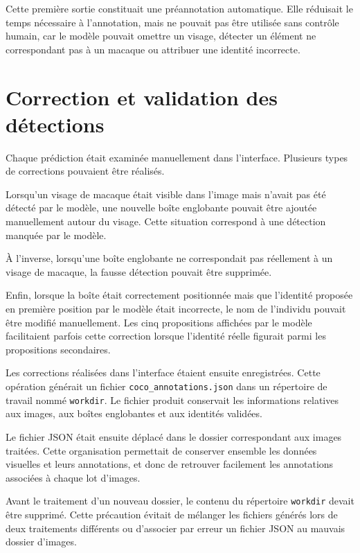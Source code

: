 \documentclass[11pt,a4paper]{report}
\begin{document}
Cette première sortie constituait une préannotation automatique. Elle réduisait
le temps nécessaire à l'annotation, mais ne pouvait pas être utilisée sans
contrôle humain, car le modèle pouvait omettre un visage, détecter un élément ne
correspondant pas à un macaque ou attribuer une identité incorrecte.

\section{Correction et validation des détections}

Chaque prédiction était examinée manuellement dans l'interface. Plusieurs types
de corrections pouvaient être réalisés.

Lorsqu'un visage de macaque était visible dans l'image mais n'avait pas été
détecté par le modèle, une nouvelle boîte englobante pouvait être ajoutée
manuellement autour du visage. Cette situation correspond à une détection
manquée par le modèle.

À l'inverse, lorsqu'une boîte englobante ne correspondait pas réellement à un
visage de macaque, la fausse détection pouvait être supprimée.

Enfin, lorsque la boîte était correctement positionnée mais que l'identité
proposée en première position par le modèle était incorrecte, le nom de
l'individu pouvait être modifié manuellement. Les cinq propositions affichées
par le modèle facilitaient parfois cette correction lorsque l'identité réelle
figurait parmi les propositions secondaires.

Les corrections réalisées dans l'interface étaient ensuite enregistrées. Cette
opération générait un fichier \texttt{coco\_annotations.json} dans un répertoire
de travail nommé \texttt{workdir}. Le fichier produit conservait les
informations relatives aux images, aux boîtes englobantes et aux identités
validées.

Le fichier JSON était ensuite déplacé dans le dossier correspondant aux images
traitées. Cette organisation permettait de conserver ensemble les données
visuelles et leurs annotations, et donc de retrouver facilement les
annotations associées à chaque lot d'images.

Avant le traitement d'un nouveau dossier, le contenu du répertoire
\texttt{workdir} devait être supprimé. Cette précaution évitait de mélanger les
fichiers générés lors de deux traitements différents ou d'associer par erreur
un fichier JSON au mauvais dossier d'images.
\end{document}
